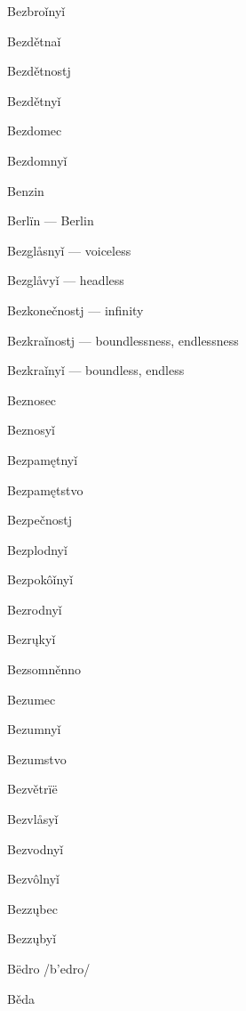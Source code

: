 Bezbroǐnyǐ 

Bezdětnaǐ 

Bezdětnostj 

Bezdětnyǐ 

Bezdomec 

Bezdomnyǐ 

Benzin 

Berlïn  — Berlin

Bezglåsnyǐ  — voiceless

Bezglåvyǐ  — headless

Bezkonečnostj  — infinity

Bezkraǐnostj  — boundlessness, endlessness

Bezkraǐnyǐ  — boundless, endless

Beznosec 

Beznosyǐ 

Bezpamętnyǐ 

Bezpamętstvo 

Bezpečnostj 

Bezplodnyǐ 

Bezpokôǐnyǐ 

Bezrodnyǐ 

Bezrųkyǐ 

Bezsomněnno 

Bezumec 

Bezumnyǐ 

Bezumstvo 

Bezvětrïë 

Bezvlåsyǐ 

Bezvodnyǐ 

Bezvôlnyǐ 

Bezzųbec 

Bezzųbyǐ 

Bëdro /b’edro/

Běda 

